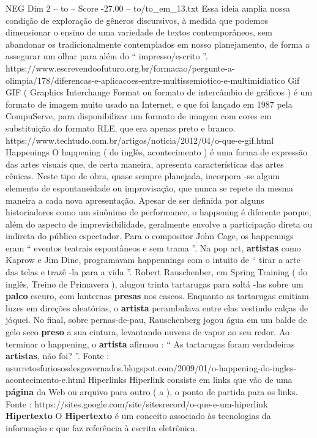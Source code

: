 \begin{textsample}{NEG Dim 2 – to – Score -27.00 – to/to\_em\_13.txt}
Essa ideia amplia nossa condição de exploração de gêneros discursivos, à medida que podemos dimensionar o ensino de uma variedade de textos contemporâneos, sem abandonar os tradicionalmente contemplados em nosso planejamento, de forma a assegurar um olhar para além do “ impresso/escrito ”. https://www.escrevendoofuturo.org.br/formacao/pergunte-a-olimpia/178/diferencas-e-aplicacoes-entre-multissemiotico-e-multimidiatico Gif GIF ( Graphics Interchange Format ou formato de intercâmbio de gráficos ) é um formato de imagem muito usado na Internet, e que foi lançado em 1987 pela CompuServe, para disponibilizar um formato de imagem com cores em substituição do formato RLE, que era apenas preto e branco. https://www.techtudo.com.br/artigos/noticia/2012/04/o-que-e-gif.html Happenings O happening ( do inglês, acontecimento ) é uma forma de expressão das artes visuais que, de certa maneira, apresenta características das artes cênicas.
Neste tipo de obra, quase sempre planejada, incorpora -se algum elemento de espontaneidade ou improvisação, que nunca se repete da mesma maneira a cada nova apresentação.
Apesar de ser definida por alguns historiadores como um sinônimo de performance, o happening é diferente porque, além do aspecto de imprevisibilidade, geralmente envolve a participação direta ou indireta do público espectador.
Para o compositor John Cage, os happenings eram “ eventos teatrais espontâneos e sem trama ”.
Na pop art, \textbf{artistas} como Kaprow e Jim Dine, programavam happennings com o intuito de “ tirar a arte das telas e trazê -la para a vida ”.
Robert Rauschenber, em Spring Training ( do inglês, Treino de Primavera ), alugou trinta tartarugas para soltá -las sobre um \textbf{palco} escuro, com lanternas \textbf{presas} nos cascos.
Enquanto as tartarugas emitiam luzes em direções aleatórias, o \textbf{artista} perambulava entre elas vestindo calças de jóquei.
No final, sobre pernas-de-pau, Rauschenberg jogou água em um balde de gelo seco \textbf{preso} a sua cintura, levantando nuvens de vapor ao seu redor.
Ao terminar o happening, o \textbf{artista} afirmou : “ As tartarugas foram verdadeiras \textbf{artistas}, não foi? ”.
Fonte : nsurretosfuriososdesgovernados.blogspot.com/2009/01/o-happening-do-ingles-acontecimento-e.html Hiperlinks Hiperlink consiste em links que vão de uma \textbf{página} da Web ou arquivo para outro ( a ), o ponto de partida para os links.
Fonte : https://sites.google.com/site/sitesrecord/o-que-e-um-hiperlink \textbf{Hipertexto} O \textbf{Hipertexto} é um conceito associado às tecnologias da informação e que faz referência à escrita eletrônica.

\end{textsample}
